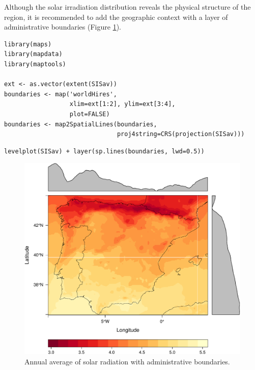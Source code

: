 \documentclass[smallroyalvopaper]{memoir}
\begin{document}
Although the solar irradiation distribution reveals the physical
structure of the region, it is recommended to add the geographic
context with a layer of administrative boundaries (Figure
\ref{fig:levelplotCMSAF_boundaries}).


\lstset{language=R,numbers=none}
\begin{lstlisting}
library(maps)
library(mapdata)
library(maptools)

ext <- as.vector(extent(SISav))
boundaries <- map('worldHires',
                  xlim=ext[1:2], ylim=ext[3:4],
                  plot=FALSE)
boundaries <- map2SpatialLines(boundaries,
                               proj4string=CRS(projection(SISav)))
\end{lstlisting}


\lstset{language=R,numbers=none}
\begin{lstlisting}
levelplot(SISav) + layer(sp.lines(boundaries, lwd=0.5))
\end{lstlisting}

\begin{figure}[htb]
\centering
\includegraphics[width=.9\linewidth]{figs/leveplotSISavBoundaries.pdf}
\caption{\label{fig:levelplotCMSAF_boundaries}Annual average of solar radiation with administrative boundaries.}
\end{figure}
\end{document}
